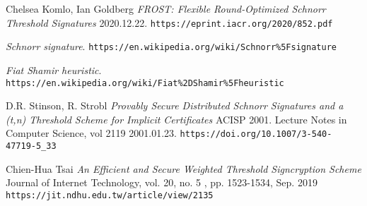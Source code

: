 \documentclass{article}
\begin{document}
\begin{thebibliography}{5}

  Chelsea Komlo, Ian Goldberg
  \emph{FROST: Flexible Round-Optimized Schnorr Threshold Signatures} 2020.12.22.
  \texttt{https://eprint.iacr.org/2020/852.pdf}

  \emph{Schnorr signature}.
  \texttt{https://en.wikipedia.org/wiki/Schnorr\%5Fsignature}

  \emph{Fiat Shamir heuristic}.
  \texttt{https://en.wikipedia.org/wiki/Fiat\%2DShamir\%5Fheuristic}

  D.R. Stinson, R. Strobl
  \emph{Provably Secure Distributed Schnorr Signatures and a (t,n) Threshold Scheme for Implicit Certificates} ACISP 2001. Lecture Notes in Computer Science, vol 2119 2001.01.23.
  \texttt{https://doi.org/10.1007/3-540-47719-5\_33}

  Chien-Hua Tsai
  \emph{An Efficient and Secure Weighted Threshold Signcryption Scheme} Journal of Internet Technology, vol. 20, no. 5 , pp. 1523-1534, Sep. 2019
  \texttt{https://jit.ndhu.edu.tw/article/view/2135}

\end{thebibliography}
\end{document}
